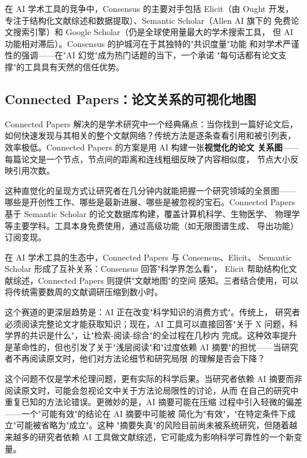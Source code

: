 在 AI 学术工具的竞争中，Consensus 的主要对手包括 Elicit（由 Ought 开发，
专注于结构化文献综述和数据提取）、Semantic Scholar（Allen AI 旗下的
免费论文搜索引擎）和 Google Scholar（仍是全球使用量最大的学术搜索工具，
但 AI 功能相对滞后）。Consensus 的护城河在于其独特的"共识度量"功能
和对学术严谨性的强调——在"AI 幻觉"成为热门话题的当下，一个承诺
"每句话都有论文支撑"的工具具有天然的信任优势。


\subsection{Connected Papers：论文关系的可视化地图}
\label{subsec:connected-papers}

Connected Papers 解决的是学术研究中一个经典痛点：当你找到一篇好论文后，
如何快速发现与其相关的整个文献网络？传统方法是逐条查看引用和被引列表，
效率极低。Connected Papers 的方案是用 AI 构建一张\textbf{视觉化的论文
关系图}——每篇论文是一个节点，节点间的距离和连线粗细反映了内容相似度，
节点大小反映引用次数。

这种直觉化的呈现方式让研究者在几分钟内就能把握一个研究领域的全景图——
哪些是开创性工作、哪些是最新进展、哪些是被忽视的宝石。Connected Papers
基于 Semantic Scholar 的论文数据库构建，覆盖计算机科学、生物医学、
物理学等主要学科。工具本身免费使用，通过高级功能（如无限图谱生成、
导出功能）订阅变现。

在 AI 学术工具的生态中，Connected Papers 与 Consensus、Elicit、
Semantic Scholar 形成了互补关系：Consensus 回答"科学界怎么看"，
Elicit 帮助结构化文献综述，Connected Papers 则提供"文献地图"的空间
感知。三者结合使用，可以将传统需要数周的文献调研压缩到数小时。

这个赛道的更深层趋势是：AI 正在改变"科学知识的消费方式"。传统上，
研究者必须阅读完整论文才能获取知识；现在，AI 工具可以直接回答"关于
X 问题，科学界的共识是什么"，让"检索-阅读-综合"的全过程在几秒内
完成。这种效率提升是革命性的，但也引发了关于"浅层阅读"和"过度依赖
AI 摘要"的担忧——当研究者不再阅读原文时，他们对方法论细节和研究局限
的理解是否会下降？

这个问题不仅是学术伦理问题，更有实际的科学后果。当研究者依赖 AI
摘要而非阅读原文时，可能会忽视论文中关于方法论局限性的讨论，从而
在自己的研究中重复已知的方法论错误。更微妙的是，AI 摘要可能在压缩
过程中引入轻微的偏差——一个"可能有效"的结论在 AI 摘要中可能被
简化为"有效"，"在特定条件下成立"可能被省略为"成立"。这种
"摘要失真"的风险目前尚未被系统研究，但随着越来越多的研究者依赖
AI 工具做文献综述，它可能成为影响科学可靠性的一个新变量。

